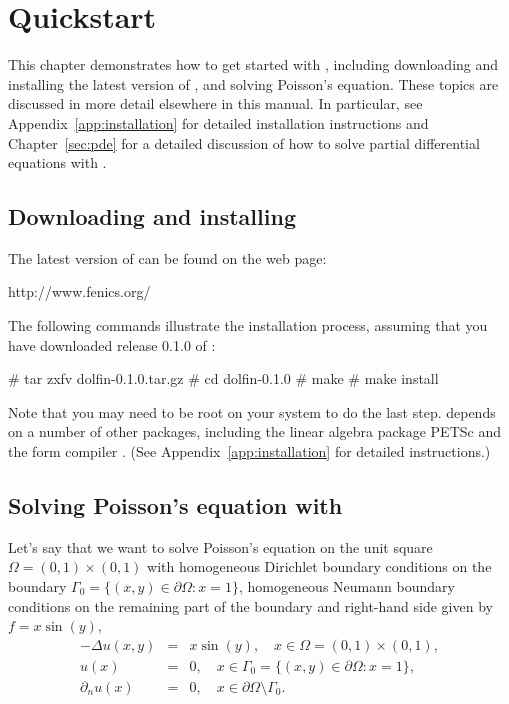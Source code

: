 \chapter{Quickstart}

This chapter demonstrates how to get started with \dolfin{}, including
downloading and installing the latest version of \dolfin{}, and solving
Poisson's equation. These topics are discussed in more detail
elsewhere in this manual. In particular, see
Appendix~\ref{app:installation} for detailed installation instructions
and Chapter~\ref{sec:pde} for a detailed discussion of how to solve
partial differential equations with \dolfin{}.

\section{Downloading and installing \dolfin{}}

The latest version of \dolfin{} can be found on the \fenics{} web page:
\begin{code}
  http://www.fenics.org/
\end{code}
The following commands illustrate the installation process, assuming
that you have downloaded release 0.1.0 of \dolfin{}:
\begin{code}
  # tar zxfv dolfin-0.1.0.tar.gz
  # cd dolfin-0.1.0
  # make
  # make install
\end{code}

Note that you may need to be root on your system to do the last
step. \dolfin{} depends on a number of other packages, including
the linear algebra package PETSc and the form compiler \ffc{}.
(See Appendix~\ref{app:installation} for detailed instructions.)

\section{Solving Poisson's equation with \dolfin{}}

Let's say that we want to solve Poisson's equation on the unit square
$\Omega = (0,1) \times (0,1)$ with homogeneous Dirichlet boundary
conditions on the boundary $\Gamma_0 = \{(x, y) \in \partial \Omega : x = 1\}$,
homogeneous Neumann boundary conditions on the remaining part of the boundary
and right-hand side given by $f = x \sin(y)$,
\begin{eqnarray} \label{eq:poisson,quickstart}
  - \Delta u(x, y) &=& x \sin(y), \quad
  x \in \Omega = (0,1) \times (0,1), \\
  u(x) &=& 0, \quad
  x \in \Gamma_0 = \{(x, y) \in \partial \Omega : x = 1\}, \\
  \partial_n u(x) &=& 0, \quad
  x \in \partial \Omega \setminus \Gamma_0.
\end{eqnarray}

